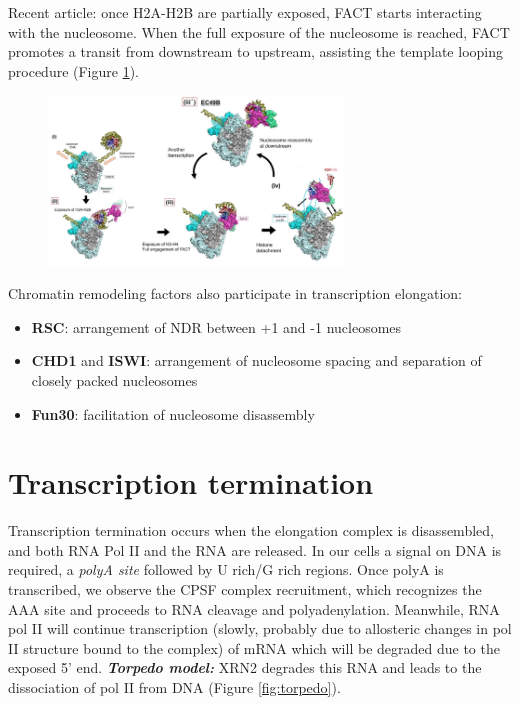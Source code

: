 Recent article: once H2A-H2B are partially exposed, FACT starts interacting with the nucleosome. When the full exposure of the nucleosome is reached, FACT promotes a transit from downstream to upstream, assisting the template looping procedure (Figure \ref{fig:exp}).

\begin{figure}
\centering
\includegraphics[width=0.7\textwidth]{../_resources/Screenshot_2022-10-10_at_10-35-12.png}
\caption{}
\label{fig:exp}
\end{figure}

Chromatin remodeling factors also participate in transcription elongation:

\begin{itemize}
\tightlist
\item
  \textbf{RSC}: arrangement of NDR between +1 and -1 nucleosomes
\item
  \textbf{CHD1} and \textbf{ISWI}: arrangement of nucleosome spacing and separation of closely packed nucleosomes
\item
  \textbf{Fun30}: facilitation of nucleosome disassembly
\end{itemize}

\hypertarget{termination}{%
\section{Transcription termination}\label{termination}}

Transcription termination occurs when the elongation complex is disassembled, and both RNA Pol II and the RNA are released. In our cells a signal on DNA is required, a \emph{polyA site} followed by U rich/G rich regions. Once polyA is transcribed, we observe the CPSF complex recruitment, which recognizes the AAA site and proceeds to RNA cleavage and polyadenylation. Meanwhile, RNA pol II will continue transcription (slowly, probably due to allosteric changes in pol II structure bound to the complex) of mRNA which will be degraded due to the exposed 5' end. \textbf{\emph{Torpedo model:}} XRN2 degrades this RNA and leads to the dissociation of pol II from DNA (Figure \ref{fig:torpedo}).

